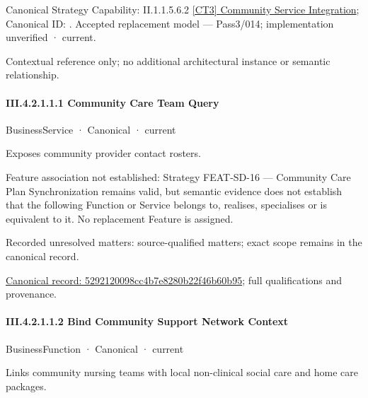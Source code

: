 {\small Canonical Strategy Capability: II.1.1.5.6.2 \hyperref[element:43bfa2a7659346d98147ef8539d6dccb]{[CT3] Community Service Integration}; Canonical ID: \texttt{}. Accepted replacement model — Pass3/014; implementation unverified · current.}\par
Contextual reference only; no additional architectural instance or semantic relationship.\par
\paragraph*{III.4.2.1.1.1 Community Care Team Query}
\label{navigation:III.4.2.1.1.1}

\label{element:5292120098cc4b7e8280b22f46b60b95}
{\small BusinessService · Canonical · current}\par

Exposes community provider contact rosters.



Feature association not established: Strategy FEAT-SD-16 — Community Care Plan Synchronization remains valid, but semantic evidence does not establish that the following Function or Service belongs to, realises, specialises or is equivalent to it. No replacement Feature is assigned.


{\small Recorded unresolved matters: source-qualified matters; exact scope remains in the canonical record.}\par
{\footnotesize \href{../../../../../../../../continuum/business/business-service/5292120098cc4b7e8280b22f46b60b95.md}{Canonical record: 5292120098cc4b7e8280b22f46b60b95}; full qualifications and provenance.}\par
\paragraph*{III.4.2.1.1.2 Bind Community Support Network Context}
\label{navigation:III.4.2.1.1.2}

\label{element:321fdf544ef044b8be100b656e16d7dc}
{\small BusinessFunction · Canonical · current}\par

Links community nursing teams with local non-clinical social care and home care packages.



